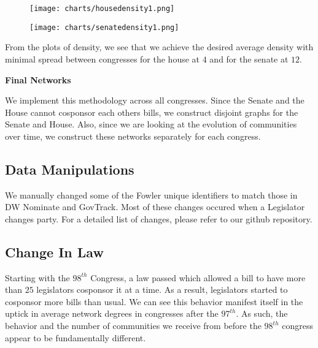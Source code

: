 \begin{figure}[h!]
    \texttt{[image: charts/housedensity1.png]}
\end{figure}

\begin{figure}[h!]
    \texttt{[image: charts/senatedensity1.png]}
\end{figure}

From the plots of density, we see that we achieve the desired average density 
with minimal spread between congresses for the house at $4$ and 
for the senate at $12$.

\vspace{3mm}

\noindent
\textbf{Final Networks}

\vspace{3mm}

We implement this methodology across all congresses. Since the Senate and the 
House cannot cosponsor each others bills, we construct disjoint graphs for 
the Senate and House. Also, since we are looking at the evolution of communities 
over time, we construct these networks separately for each congress.

\subsection{Data Manipulations}

We manually changed some of the Fowler unique identifiers to match those in  DW
Nominate and GovTrack. Most of these changes occured when a Legislator  changes
party. For a detailed list of changes, please refer to our github repository.

\subsection{Change In Law}

Starting with the $98^{th}$ Congress, a law passed which allowed a bill to have
more than $25$ legislators cosponsor it at a time. As a result, legislators
started to cosponsor more bills than usual. We can see this behavior manifest
itself in the uptick in average network degrees in congresses after the
$97^{th}$. As such, the behavior and the number of communities we receive from
before the $98^{th}$ congress appear to be fundamentally different.
